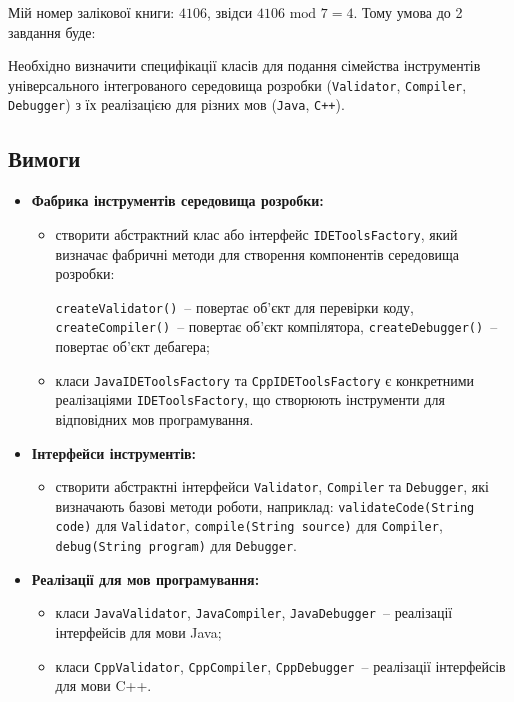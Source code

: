 \documentclass[12pt,a4paper]{article}
\begin{document}
    Мій номер залікової книги: $4106$, звідси $4106 \text{ mod } 7 = 4$. Тому умова до 2 завдання буде:

    Необхідно визначити специфікації класів для подання сімейства інструментів
    універсального інтегрованого середовища розробки
    (\texttt{Validator}, \texttt{Compiler}, \texttt{Debugger}) з їх реалізацією
    для різних мов (\texttt{Java}, \texttt{C++}).

    \subsection*{Вимоги}

    \begin{itemize}
        \item \textbf{Фабрика інструментів середовища розробки:}
        \begin{itemize}
            \item створити абстрактний клас або інтерфейс \texttt{IDEToolsFactory},
            який визначає фабричні методи для створення компонентів середовища
            розробки:

            \texttt{createValidator()}~-- повертає об’єкт для перевірки коду,
            \texttt{createCompiler()}~-- повертає об’єкт компілятора,
            \texttt{createDebugger()}~-- повертає об’єкт дебагера;
            \item класи \texttt{JavaIDEToolsFactory} та \texttt{CppIDEToolsFactory}
            є конкретними реалізаціями \texttt{IDEToolsFactory}, що створюють
            інструменти для відповідних мов програмування.
        \end{itemize}

        \item \textbf{Інтерфейси інструментів:}
        \begin{itemize}
            \item створити абстрактні інтерфейси \texttt{Validator},
            \texttt{Compiler} та \texttt{Debugger}, які визначають базові методи роботи,
            наприклад:
            \texttt{validateCode(String code)} для \texttt{Validator},
            \texttt{compile(String source)} для \texttt{Compiler},
            \texttt{debug(String program)} для \texttt{Debugger}.
        \end{itemize}

        \item \textbf{Реалізації для мов програмування:}
        \begin{itemize}
            \item класи \texttt{JavaValidator}, \texttt{JavaCompiler},
            \texttt{JavaDebugger}~-- реалізації інтерфейсів для мови Java;
            \item класи \texttt{CppValidator}, \texttt{CppCompiler},
            \texttt{CppDebugger}~-- реалізації інтерфейсів для мови C++.
        \end{itemize}


\end{itemize}
\end{document}
